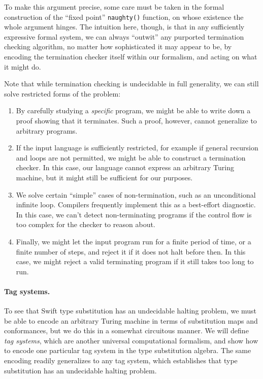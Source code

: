 \documentclass[../generics]{subfiles}
\begin{document}
To make this argument precise, some care must be taken in the formal construction of the ``fixed point'' \texttt{naughty()} function, on whose existence the whole argument hinges. The intuition here, though, is that in any sufficiently expressive formal system, we can always ``outwit'' any purported termination checking algorithm, no matter how sophisticated it may appear to be, by encoding the termination checker itself within our formalism, and acting on what it might do.

Note that while termination checking is undecidable in full generality, we can still solve restricted forms of the problem:
\begin{enumerate}
\item By carefully studying a \emph{specific} program, we might be able to write down a proof showing that it terminates. Such a proof, however, cannot generalize to arbitrary programs.
\item If the input language is sufficiently restricted, for example if general recursion and loops are not permitted, we might be able to construct a termination checker. In this case, our language cannot express an arbitrary Turing machine, but it might still be sufficient for our purposes.
\item We solve certain ``simple'' cases of non-termination, such as an unconditional infinite loop. Compilers frequently implement this as a best-effort diagnostic. In this case, we can't detect non-terminating programs if the control flow is too complex for the checker to reason about.
\item Finally, we might let the input program run for a finite period of time, or a finite number of steps, and reject it if it does not halt before then. In this case, we might reject a valid terminating program if it still takes too long to run.
\end{enumerate}

\paragraph{Tag systems.} To see that Swift type substitution has an undecidable halting problem, we must be able to encode an arbitrary Turing machine in terms of substitution maps and conformances, but we do this in a somewhat circuitous manner. We will define \emph{tag systems}, which are another universal computational formalism, and show how to encode one particular tag system in the type substitution algebra. The same encoding readily generalizes to any tag system, which establishes that type substitution has an undecidable halting problem.
\end{document}
